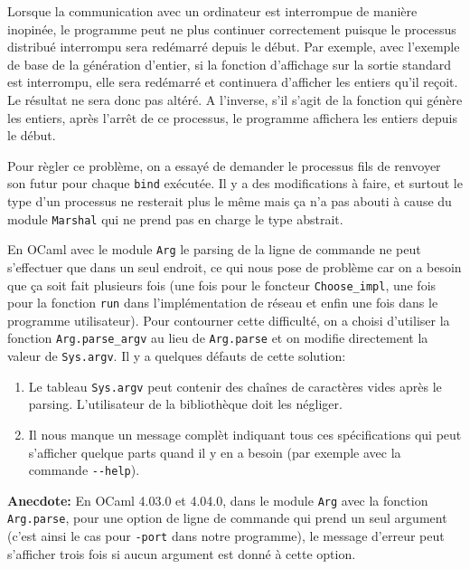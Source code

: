 \documentclass[]{scrartcl}
\begin{document}
Lorsque la communication avec un ordinateur est interrompue de manière
inopinée, le programme peut ne plus continuer correctement puisque le
processus distribué interrompu sera redémarré depuis le début. Par
exemple, avec l'exemple de base de la génération d'entier, si la
fonction d'affichage sur la sortie standard est interrompu, elle sera
redémarré et continuera d'afficher les entiers qu'il reçoit. Le résultat
ne sera donc pas altéré. A l'inverse, s'il s'agit de la fonction qui
génère les entiers, après l'arrêt de ce processus, le programme
affichera les entiers depuis le début.

Pour règler ce problème, on a essayé de demander le processus fils de
renvoyer son futur pour chaque \lstinline!bind! exécutée. Il y a des
modifications à faire, et surtout le type d'un processus ne resterait
plus le même mais ça n'a pas abouti à cause du module
\lstinline!Marshal! qui ne prend pas en charge le type abstrait.

En OCaml avec le module \lstinline!Arg! le parsing de la ligne de
commande ne peut s'effectuer que dans un seul endroit, ce qui nous pose
de problème car on a besoin que ça soit fait plusieurs fois (une fois
pour le foncteur \lstinline!Choose_impl!, une fois pour la fonction
\lstinline!run! dans l'implémentation de réseau et enfin une fois dans
le programme utilisateur). Pour contourner cette difficulté, on a choisi
d'utiliser la fonction \lstinline!Arg.parse_argv! au lieu de
\lstinline!Arg.parse! et on modifie directement la valeur de
\lstinline!Sys.argv!. Il y a quelques défauts de cette solution:

\begin{enumerate}
\def\labelenumi{\arabic{enumi}.}
\item
  Le tableau \lstinline!Sys.argv! peut contenir des chaînes de
  caractères vides après le parsing. L'utilisateur de la bibliothèque
  doit les négliger.
\item
  Il nous manque un message complèt indiquant tous ces spécifications
  qui peut s'afficher quelque parts quand il y en a besoin (par exemple
  avec la commande \lstinline!--help!).
\end{enumerate}

\textbf{Anecdote:} En OCaml 4.03.0 et 4.04.0, dans le module
\lstinline!Arg! avec la fonction \lstinline!Arg.parse!, pour une option
de ligne de commande qui prend un seul argument (c'est ainsi le cas pour
\lstinline!-port! dans notre programme), le message d'erreur peut
s'afficher trois fois si aucun argument est donné à cette option.
\end{document}
